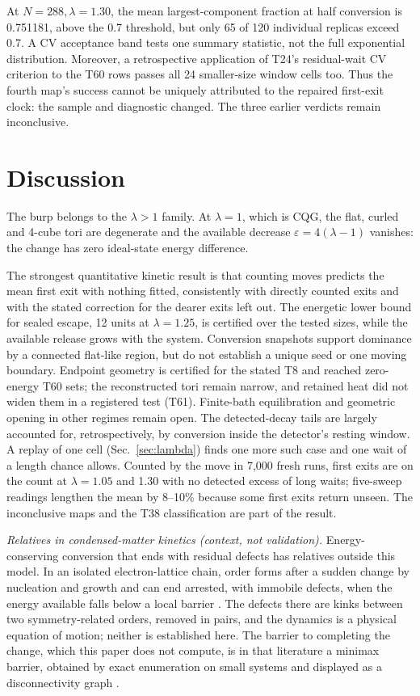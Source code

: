 \documentclass[aps,pre,10pt,twocolumn,superscriptaddress,nofootinbib]{revtex4-2}
\begin{document}
At $N=288,\lambda=1.30$, the mean largest-component fraction at half conversion is 0.751181,
above the 0.7 threshold, but only 65 of 120 individual replicas exceed 0.7. A CV acceptance
band tests one summary statistic, not the full exponential distribution. Moreover, a retrospective
application of T24's residual-wait CV criterion to the T60 rows passes all 24 smaller-size
window cells too. Thus the fourth map's success cannot be uniquely attributed to the repaired
first-exit clock: the sample and diagnostic changed. The three earlier verdicts remain inconclusive.

\section{Discussion}

The burp belongs to the $\lambda>1$ family. At $\lambda=1$, which is CQG, the flat, curled and 4-cube
tori are degenerate and the available decrease $\varepsilon=4(\lambda-1)$ vanishes: the change has
zero ideal-state energy difference.

The strongest quantitative kinetic result is that counting moves predicts the mean first exit with
nothing fitted, consistently with directly counted exits and with the stated correction for the dearer
exits left out. The energetic lower bound for sealed escape, 12 units at $\lambda=1.25$, is certified over the
tested sizes, while the available release grows with the system. Conversion snapshots support
dominance by a connected flat-like region, but do not establish a unique seed or one moving boundary.
Endpoint geometry is certified for the stated T8 and reached zero-energy T60 sets; the reconstructed
tori remain narrow, and retained heat did not widen them in a registered test (T61). Finite-bath
equilibration and geometric opening in other regimes remain open.
The detected-decay tails are largely accounted for, retrospectively, by
conversion inside the detector's resting window. A replay of one cell (Sec.~\ref{sec:lambda})
finds one more such case and one wait of a length chance allows. Counted by the move in 7,000 fresh
runs, first exits are on the count at $\lambda=1.05$ and 1.30 with no detected excess of long waits; five-sweep readings
lengthen the mean by 8--10\% because some first exits return unseen.
The inconclusive maps and the T38 classification are part of the result.

\emph{Relatives in condensed-matter kinetics (context, not validation).} Energy-conserving conversion
that ends with residual defects has relatives outside this model. In an isolated electron-lattice
chain, order forms after a sudden change by nucleation and growth and can end arrested, with immobile
defects, when the energy available falls below a local barrier \cite{JC26}. The defects there are
kinks between two symmetry-related orders, removed in pairs, and the dynamics is a physical equation
of motion; neither is established here. The barrier to completing the change, which this paper does not
compute, is in that literature a minimax barrier, obtained by exact enumeration on small systems and displayed as a
disconnectivity graph \cite{LLC26a}.
\end{document}
